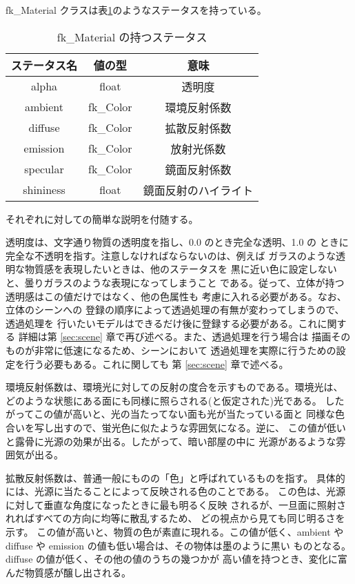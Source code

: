 fk\_Material クラスは表\ref{tbl:fkMaterial1}のようなステータスを持っている。

\begin{table}[H]
\caption{fk\_Material の持つステータス}
\label{tbl:fkMaterial1}
\begin{center}
\begin{tabular}{|c|c|c|}
\hline
ステータス名 & 値の型 & 意味 \\ \hline \hline
alpha & float & 透明度 \\ \hline
ambient & fk\_Color & 環境反射係数 \\ \hline
diffuse & fk\_Color & 拡散反射係数 \\ \hline
emission & fk\_Color & 放射光係数 \\ \hline
specular & fk\_Color & 鏡面反射係数 \\ \hline
shininess & float & 鏡面反射のハイライト \\ \hline
\end{tabular}
\end{center}
\end{table}
それぞれに対しての簡単な説明を付随する。

透明度は、文字通り物質の透明度を指し、0.0 のとき完全な透明、1.0 の
ときに完全な不透明を指す。注意しなければならないのは、例えば
ガラスのような透明な物質感を表現したいときは、他のステータスを
黒に近い色に設定しないと、曇りガラスのような表現になってしまうこと
である。従って、立体が持つ透明感はこの値だけではなく、他の色属性も
考慮に入れる必要がある。なお、立体のシーンへの
登録の順序によって透過処理の有無が変わってしまうので、透過処理を
行いたいモデルはできるだけ後に登録する必要がある。これに関する
詳細は第 \ref{sec:scene} 章で再び述べる。また、透過処理を行う場合は
描画そのものが非常に低速になるため、シーンにおいて
透過処理を実際に行うための設定を行う必要もある。これに関しても
第 \ref{sec:scene} 章で述べる。

環境反射係数は、環境光に対しての反射の度合を示すものである。環境光は、
どのような状態にある面にも同様に照らされる(と仮定された)光である。
したがってこの値が高いと、光の当たってない面も光が当たっている面と
同様な色合いを写し出すので、蛍光色に似たような雰囲気になる。逆に、
この値が低いと露骨に光源の効果が出る。したがって、暗い部屋の中に
光源があるような雰囲気が出る。

拡散反射係数は、普通一般にものの「色」と呼ばれているものを指す。
具体的には、光源に当たることによって反映される色のことである。
この色は、光源に対して垂直な角度になったときに最も明るく反映
されるが、一旦面に照射されればすべての方向に均等に散乱するため、
どの視点から見ても同じ明るさを示す。
この値が高いと、物質の色が素直に現れる。この値が低く、ambient や
diffuse や emission の値も低い場合は、その物体は墨のように黒い
ものとなる。diffuse の値が低く、その他の値のうちの幾つかが
高い値を持つとき、変化に富んだ物質感が醸し出される。

